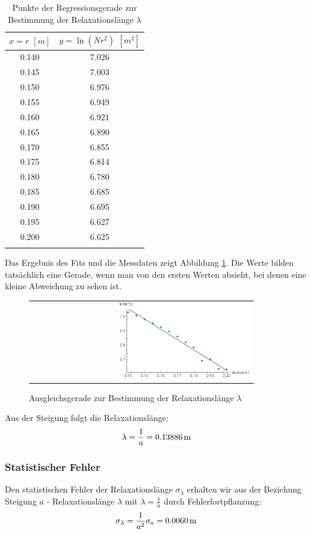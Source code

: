 \documentclass[a4paper,titlepage]{scrartcl}
\numberwithin{equation}{section}
\begin{document}
\begin{longtable}[H]{c|c}
$x=r$ $[m]$ & $y=\ln{(N r^2)}$ $[m^2]$ \\
\hline
0.140 & 7.026\\
0.145 & 7.003\\
0.150 & 6.976\\
0.155 & 6.949\\
0.160 & 6.921\\
0.165 & 6.890\\
0.170 & 6.855\\
0.175 & 6.814\\
0.180 & 6.780\\
0.185 & 6.685\\
0.190 & 6.695\\
0.195 & 6.627\\
0.200 & 6.625\\
\caption{Punkte der Regressionsgerade zur Bestimmung der Relaxationslänge $\lambda$}
\label{tab:regressionRelaxation}
\end{longtable}
Das Ergebnis des Fits und die Messdaten zeigt Abbildung \ref{fig:relaxationsGerade}. Die Werte bilden tatsächlich eine Gerade, wenn man von den ersten Werten absieht, bei denen eine kleine Abweichung zu sehen ist. 
\begin{figure}[H]
	\centering
	\begin{tabular}{@{}r@{}}
		\includegraphics[width=0.6\textwidth]{images/relaxation.png}
	\end{tabular}
	\caption{Ausgleichsgerade zur Bestimmung der Relaxationslänge $\lambda$}
    \label{fig:relaxationsGerade}
\end{figure}
Aus der Steigung folgt die Relaxationslänge:
\begin{equation*}
\lambda = \frac{1}{a} = \unit[0.13886]{m}
\end{equation*}

\subsubsection{Statistischer Fehler}
Den statistischen Fehler der Relaxationslänge $\sigma_{\lambda}$ erhalten wir aus der Beziehung Steigung $a$ - Relaxationslänge $\lambda$ mit $\lambda=\frac{1}{a}$ durch Fehlerfortpflanzung:
\begin{equation*}
\sigma_{\lambda}=\frac{1}{a^2}\sigma_a=\unit[0.0060]{m}
\end{equation*}
\end{document}
